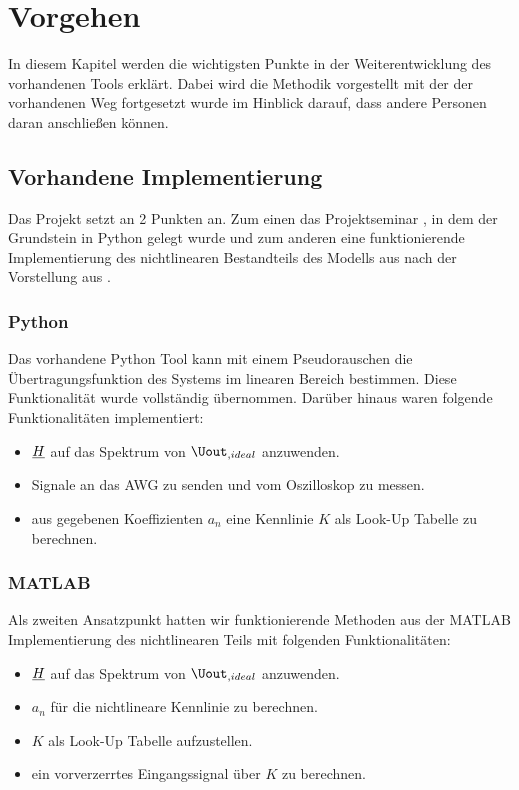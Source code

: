 \documentclass[../Report.tex]{subfiles}
\begin{document}
\chapter{Vorgehen}
\label{chap:vorgehen}
In diesem Kapitel werden die wichtigsten Punkte in der Weiterentwicklung des vorhandenen Tools erklärt. Dabei wird die Methodik vorgestellt mit der der vorhandenen Weg fortgesetzt wurde im Hinblick darauf, dass andere Personen daran anschließen können.
\section[Vorhandene Implementierung]{Vorhandene Implementierung}
\label{sec:vorg.setup}
Das Projekt setzt an 2 Punkten an. Zum einen das Projektseminar \cite{PJS_Denys}, in dem der Grundstein in Python gelegt wurde und zum anderen eine funktionierende Implementierung des nichtlinearen Bestandteils des Modells aus  nach der Vorstellung aus \cite{harzheim}.
\subsection{Python}
\label{sec:vorg.python}
Das vorhandene Python Tool kann mit einem Pseudorauschen die Übertragungsfunktion des Systems im linearen Bereich bestimmen. Diese Funktionalität wurde vollständig übernommen. Darüber hinaus waren folgende Funktionalitäten implementiert:
\begin{itemize}
	\item	$\underline{H}$ auf das Spektrum von $\Uout_{,ideal}$ anzuwenden.
	
	\item	Signale an das AWG zu senden und vom Oszilloskop zu messen.
	
	\item	aus gegebenen Koeffizienten $a_n$ eine Kennlinie $K$ als Look-Up Tabelle zu berechnen.
\end{itemize}
\subsection{MATLAB}
\label{sec:vorg.matlab}
Als zweiten Ansatzpunkt hatten wir funktionierende Methoden aus der MATLAB Implementierung des nichtlinearen Teils mit folgenden Funktionalitäten:
\begin{itemize}
	\item	$\underline{H}$ auf das Spektrum von $\Uout_{,ideal}$ anzuwenden.
	
	\item	$a_n$ für die nichtlineare Kennlinie zu berechnen.
	
	\item	$K$ als Look-Up Tabelle aufzustellen.
	
	\item	ein vorverzerrtes Eingangssignal über $K$ zu berechnen.
\end{itemize}
\end{document}
